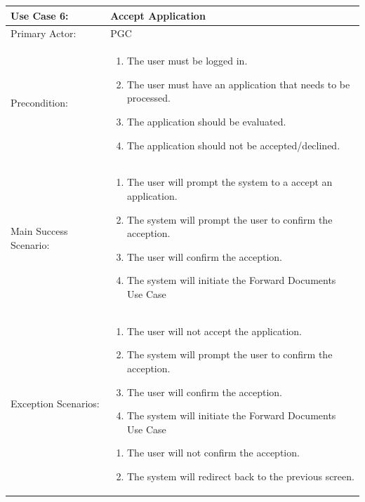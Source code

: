 \documentclass{article}
\begin{document}
\begin{tabular} {| m{5cm} | m{10cm} |}
\hline
Use Case 6: & Accept Application \\
\hline
Primary Actor: & PGC \\
\hline
Precondition: & \begin{enumerate} \itemsep0em \item The user must be logged in. 
\item The user must have an application that needs to be processed.
\item The application should be evaluated.
\item The application should not be accepted/declined.
\end{enumerate} \\
\hline
Main Success Scenario: & \begin{enumerate} \itemsep0em \item The user will prompt the system to a accept an application.
\item The system will prompt the user to confirm the acception.
\item The user will confirm the acception.
\item The system will initiate the Forward Documents Use Case
\end{enumerate}\\
\hline
Exception Scenarios: & \begin{enumerate} \itemsep0em \item The user will not accept the application.
\item The system will prompt the user to confirm the acception.
\item The user will confirm the acception.
\item The system will initiate the Forward Documents Use Case
\end{enumerate} \begin{enumerate}  \itemsep0em \item The user will not confirm the acception.
\item The system will redirect back to the previous screen.
\end{enumerate} \\
\hline
\end{tabular}
\\ \\ \\ \\
\end{document}
